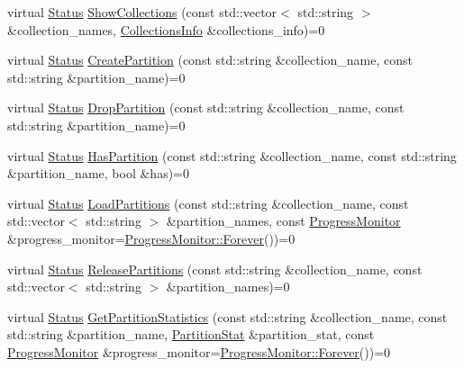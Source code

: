 \begin{DoxyCompactItemize}
\item 
virtual \hyperlink{classmilvus_1_1_status}{Status} \hyperlink{classmilvus_1_1_milvus_client_a8c5d625d72056a6e4f2f98607ebd0051}{Show\+Collections} (const std\+::vector$<$ std\+::string $>$ \&collection\+\_\+names, \hyperlink{namespacemilvus_aca75f624e858185d26527e9c47b40ed6}{Collections\+Info} \&collections\+\_\+info)=0
\item 
virtual \hyperlink{classmilvus_1_1_status}{Status} \hyperlink{classmilvus_1_1_milvus_client_ac6faae944235d8beb57afc6338b58e71}{Create\+Partition} (const std\+::string \&collection\+\_\+name, const std\+::string \&partition\+\_\+name)=0
\item 
virtual \hyperlink{classmilvus_1_1_status}{Status} \hyperlink{classmilvus_1_1_milvus_client_ace9cde4343f511d94549fd4505401a34}{Drop\+Partition} (const std\+::string \&collection\+\_\+name, const std\+::string \&partition\+\_\+name)=0
\item 
virtual \hyperlink{classmilvus_1_1_status}{Status} \hyperlink{classmilvus_1_1_milvus_client_ab98f1437e7b1848faef879569ff0e119}{Has\+Partition} (const std\+::string \&collection\+\_\+name, const std\+::string \&partition\+\_\+name, bool \&has)=0
\item 
virtual \hyperlink{classmilvus_1_1_status}{Status} \hyperlink{classmilvus_1_1_milvus_client_ab62aab9f13a337fb9012c7e759458ac3}{Load\+Partitions} (const std\+::string \&collection\+\_\+name, const std\+::vector$<$ std\+::string $>$ \&partition\+\_\+names, const \hyperlink{classmilvus_1_1_progress_monitor}{Progress\+Monitor} \&progress\+\_\+monitor=\hyperlink{classmilvus_1_1_progress_monitor_afad65b07af8419780f2457992ee7ce7d}{Progress\+Monitor\+::\+Forever}())=0
\item 
virtual \hyperlink{classmilvus_1_1_status}{Status} \hyperlink{classmilvus_1_1_milvus_client_a24576d00b4baa08d13de0d9eecffc7bd}{Release\+Partitions} (const std\+::string \&collection\+\_\+name, const std\+::vector$<$ std\+::string $>$ \&partition\+\_\+names)=0
\item 
virtual \hyperlink{classmilvus_1_1_status}{Status} \hyperlink{classmilvus_1_1_milvus_client_a91ad7ca6b18c8c1eafd10ea0d6af1c61}{Get\+Partition\+Statistics} (const std\+::string \&collection\+\_\+name, const std\+::string \&partition\+\_\+name, \hyperlink{classmilvus_1_1_partition_stat}{Partition\+Stat} \&partition\+\_\+stat, const \hyperlink{classmilvus_1_1_progress_monitor}{Progress\+Monitor} \&progress\+\_\+monitor=\hyperlink{classmilvus_1_1_progress_monitor_afad65b07af8419780f2457992ee7ce7d}{Progress\+Monitor\+::\+Forever}())=0

\end{DoxyCompactItemize}
